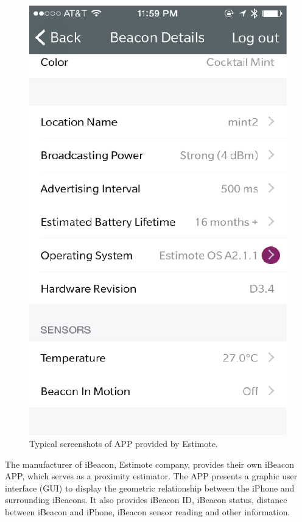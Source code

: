 \documentclass[12pt]{report}
\begin{document}
\begin{figure}[!t]
{\begin{minipage}[htb]{0.25\textwidth}
			\includegraphics[width = \textwidth]{pictures/3_9c.eps}
		\end{minipage}
	}
	\caption{Typical screenshots of APP provided by Estimote.}
	\label{fig: 3.9}
\end{figure}

The manufacturer of iBeacon, Estimote company, provides their own iBeacon APP, which serves as a proximity estimator. The APP presents a graphic user interface (GUI) to display the geometric relationship between the iPhone and surrounding iBeacons. It also provides iBeacon ID, iBeacon status, distance between iBeacon and iPhone, iBeacon sensor reading and other information. 
\end{document}
